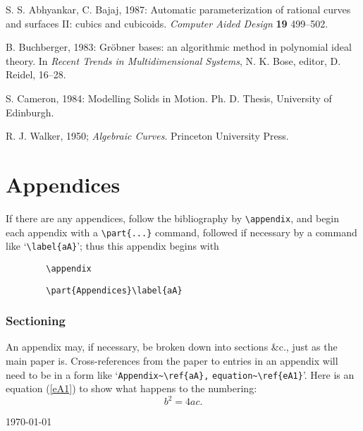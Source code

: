         \begin{thebibliography}{99}\label{bib}
 
         S. S. Abhyankar, C. Bajaj,
        1987: Automatic parameterization of rational
        curves and surfaces II: cubics and cubicoids.
        {\em Computer Aided Design} {\bf 19} 499--502.
 
         B. Buchberger, 1983:
        Gr\"{o}bner bases: an algorithmic method in
        polynomial ideal theory. In {\em Recent Trends
        in Multidimensional Systems}, N. K. Bose, editor,
        D. Reidel, 16--28.
 
         S. Cameron, 1984:
        Modelling Solids in Motion.
        Ph. D. Thesis, University of Edinburgh.
 
         R. J. Walker, 1950;
        {\em Algebraic Curves}.
        Princeton University Press.
 
        \end{thebibliography}
 
\appendix
 
\part{Appendices}\label{aA}
 
If there are any appendices, follow the bibliography by \verb!\appendix!,
and begin each appendix with a \verb!\part{...}! command, followed
if necessary by a command like `\verb!\label{aA}!'; thus this appendix
begins with
\begin{verbatim}
        \appendix
\end{verbatim}
 
\begin{verbatim}
        \part{Appendices}\label{aA}
\end{verbatim}
 
\section{Sectioning}\label{sA1}
 
An appendix may, if necessary, be broken down into sections \&c., just as
the main paper is. Cross-references from the paper to entries in an
appendix will need to be in a form like `\verb!Appendix~\ref{aA},!
\verb!equation~\ref{eA1}!'.   Here is an equation (\ref{eA1}) to show what
happens to the numbering:
\begin{equation}b^2=4ac.\label{eA1}\end{equation}
 
\begin{flushright}\today\end{flushright}
 



